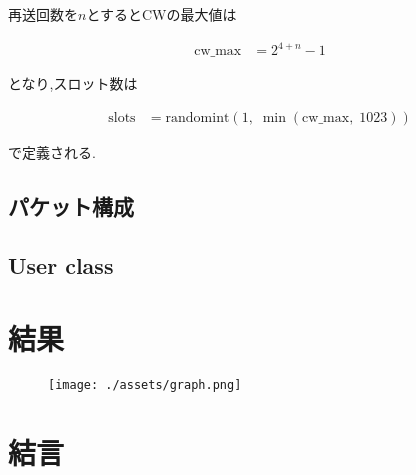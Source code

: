 \documentclass[a4paper, 10pt]{ltjsarticle}
\begin{document}
再送回数を$n$とするとCWの最大値は

\begin{align}
  \text{cw\_max} &= 2^{4 + n} - 1
\end{align}

となり,スロット数は

\begin{align}
  \text{slots} &= \mathrm{randomint}(1, \; \min(\text{cw\_max}, \; 1023))
\end{align}

で定義される.


\subsection{パケット構成}

\subsection{User class}


\section{結果}

\begin{figure}[h]
  \centering
  \texttt{[image: ./assets/graph.png]}
\end{figure}

\section{結言}
\end{document}
